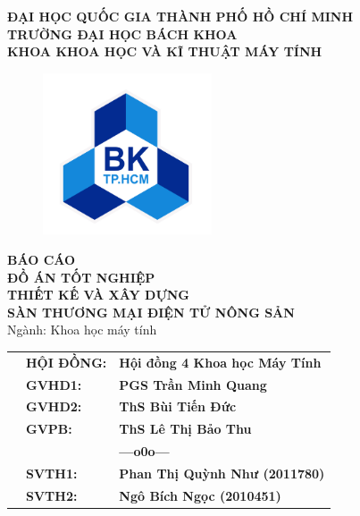 \documentclass[12pt, a4paper]{report}
\theoremstyle{definition}
\begin{document}
\begin{titlepage}

\begin{center}
\large \textbf{ĐẠI HỌC QUỐC GIA THÀNH PHỐ HỒ CHÍ MINH} \\
\large \textbf{TRƯỜNG ĐẠI HỌC BÁCH KHOA} \\
\large \textbf{KHOA KHOA HỌC VÀ KĨ THUẬT MÁY TÍNH}
\end{center}

\begin{figure}[h!]
\begin{center}
\includegraphics[width=5cm]{Images/hcmut.png}
\end{center}
\end{figure}

\begin{center}
{\textbf{{\Large BÁO CÁO}}}\\
{\textbf{{\Large ĐỒ ÁN TỐT NGHIỆP}}}\\
\vspace{1cm}
\textbf{\LARGE THIẾT KẾ VÀ XÂY DỰNG}\\
\textbf{\LARGE SÀN THƯƠNG MẠI ĐIỆN TỬ NÔNG SẢN}\\
\vspace{0.5cm}
{\Large Ngành: Khoa học máy tính}\\
\end{center}

\vspace{1cm}
\begin{table}[h]
\begin{tabular}{rll}
\hspace{3.8cm} 
& \textbf{\Large HỘI ĐỒNG:} & \textbf{\Large Hội đồng 4 Khoa học Máy Tính}\\
& \textbf{\Large GVHD1:} & \textbf{\Large PGS Trần Minh Quang}\\
& \textbf{\Large GVHD2:} & \textbf{\Large ThS Bùi Tiến Đức}\\
& \textbf{\Large GVPB:} & \textbf{\Large ThS Lê Thị Bảo Thu }\\
&                   &\textbf{---o0o---} \\
& \textbf{\Large SVTH1:} & \textbf{\Large Phan Thị Quỳnh Như (2011780)}\\
& \textbf{\Large SVTH2:} & \textbf{\Large Ngô Bích Ngọc (2010451)}


\end{tabular}
\end{table}
\end{titlepage}
\end{document}
